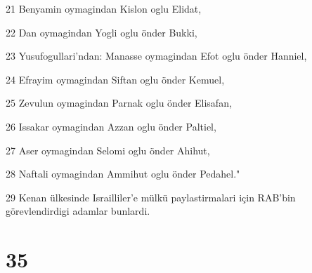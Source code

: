 \par 21 Benyamin oymagindan Kislon oglu Elidat,
\par 22 Dan oymagindan Yogli oglu önder Bukki,
\par 23 Yusufogullari'ndan: Manasse oymagindan Efot oglu önder Hanniel,
\par 24 Efrayim oymagindan Siftan oglu önder Kemuel,
\par 25 Zevulun oymagindan Parnak oglu önder Elisafan,
\par 26 Issakar oymagindan Azzan oglu önder Paltiel,
\par 27 Aser oymagindan Selomi oglu önder Ahihut,
\par 28 Naftali oymagindan Ammihut oglu önder Pedahel."
\par 29 Kenan ülkesinde Israilliler'e mülkü paylastirmalari için RAB'bin görevlendirdigi adamlar bunlardi.

\chapter{35}

